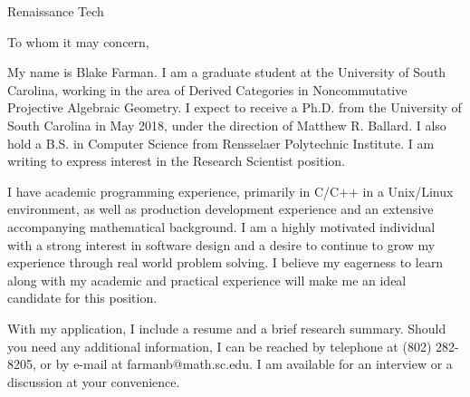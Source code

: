 \documentclass{letter}
\begin{document}
\newcommand{\loc}{glassdoor.com}
\newcommand{\posting}{Research Scientist position}
\newcommand{\employer}{Renaissance Tech}

\def\materials{a resume and a brief research summary}
\begin{letter}{\employer}
  \opening{To whom it may concern,}
  
  My name is Blake Farman.
  I am a graduate student at the University of South Carolina, working in the area of Derived Categories in Noncommutative Projective Algebraic Geometry.
  I expect to receive a Ph.D. from the University of South Carolina in May 2018, under the direction of Matthew R. Ballard.
  I also hold a B.S. in Computer Science from Rensselaer Polytechnic Institute.
  I am writing to express interest in the \posting.

  I have academic programming experience, primarily in C/C++ in a Unix/Linux environment, as well as production development experience and an extensive accompanying mathematical background.
  I am a highly motivated individual with a strong interest in software design and a desire to continue to grow my experience through real world problem solving.  
  I believe my eagerness to learn along with my academic and practical experience will make me an ideal candidate for this position.

  With my application, I include \materials.
  Should you need any additional information, I can be reached by telephone at (802) 282-8205, or by e-mail at farmanb@math.sc.edu.  
  I am available for an interview or a discussion at your convenience.  
  

\end{letter}
\end{document}

